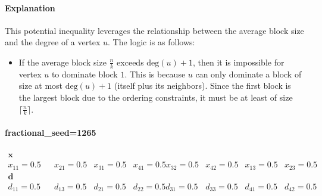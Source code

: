 \paragraph{Explanation} This potential inequality leverages the relationship between the average block size and the degree of a vertex $u$. The logic is as follows:
\begin{itemize}
    \item If the average block size $\frac{n}{k}$ exceeds $\text{deg}(u) + 1$, then it is impossible for vertex $u$ to dominate block $1$. This is because $u$ can only dominate a block of size at most $\text{deg}(u) + 1$ (itself plus its neighbors). Since the first block is the largest block due to the ordering constraints, it must be at least of size $\lceil \frac{n}{k} \rceil$.
\end{itemize}

\paragraph{fractional\_seed=1265}
\[
\begin{array}{cccccccc}
\textbf{x variables:} \\
x_{11} = 0.5 & x_{21} = 0.5 & x_{31} = 0.5 & x_{41} = 0.5
x_{32} = 0.5 & x_{42} = 0.5 & x_{13} = 0.5 & x_{23} = 0.5
\\
\textbf{d variables:} \\
d_{11} = 0.5 & d_{13} = 0.5 & d_{21} = 0.5 & d_{22} = 0.5
d_{31} = 0.5 & d_{33} = 0.5 & d_{41} = 0.5 & d_{42} = 0.5
\end{array}
\]
